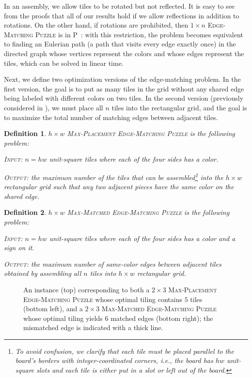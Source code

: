 \documentclass[11pt]{article}
\newtheorem{definition}{Definition}
\begin{document}
In an assembly, we allow tiles to be rotated but not reflected.
It is easy to see from the proofs that all of our results hold
if we allow reflections in addition to rotations.
On the other hand, if rotations are prohibited, then \textsc{$1 \times n$ Edge-Matching Puzzle} is in P~\cite{EFW11}: with this restriction, the problem becomes equivalent to finding an Eulerian path (a path that visits every edge exactly once) in the directed graph whose vertices represent the colors and whose edges represent the tiles, which can be solved in linear time.

Next, we define two optimization versions of the edge-matching problem.
In the first version, the goal is to put as many tiles in the grid without any shared edge being labeled with different colors on two tiles.
In the second version (previously considered in \cite{Antoniadis-Lingas-2010}),
we must place all $n$ tiles into the rectangular grid, and the goal is to maximize the total number of matching edges between adjacent tiles.

\begin{definition}
	\textsc{$h \times w$ Max-Placement Edge-Matching Puzzle} is the following problem:

	\textsc{Input:} $n = h w$ unit-square tiles where each of the four sides has a color.

	\textsc{Output:} the maximum number of the tiles that can be assembled\footnote{To avoid confusion, we clarify that each tile must be placed parallel to the board's borders with integer-coordinated corners, i.e., the board has $h w$ unit-square slots and each tile is either put in a slot or left out of the board.} into the $h \times w$ rectangular grid such that any two adjacent pieces have the same color on the shared edge.
\end{definition}

\begin{definition} \label{def-mme-variation}
	\textsc{$h \times w$ Max-Matched Edge-Matching Puzzle} is the following problem:

	\textsc{Input:} $n = h w$ unit-square tiles where each of the four sides has a color and a sign on it.

	\textsc{Output:} the maximum number of same-color edges between adjacent tiles obtained by assembling all $n$ tiles into $h \times w$ rectangular grid.
\end{definition}

\begin{figure}
	\centering
	\begin{subfigure}[c]{\textwidth}
		\centering
		\scalebox{0.8}{}
	\end{subfigure}
	\caption{An instance (top) corresponding to both a \textsc{$2 \times 3$ Max-Placement Edge-Matching Puzzle} whose optimal tiling contains $5$ tiles (bottom left), and a \textsc{$2 \times 3$ Max-Matched Edge-Matching Puzzle} whose optimal tiling yields $6$ matched edges (bottom right); the mismatched edge is indicated with a thick line.}
	\label{fig:2x3-approx}
\end{figure}
\end{document}
